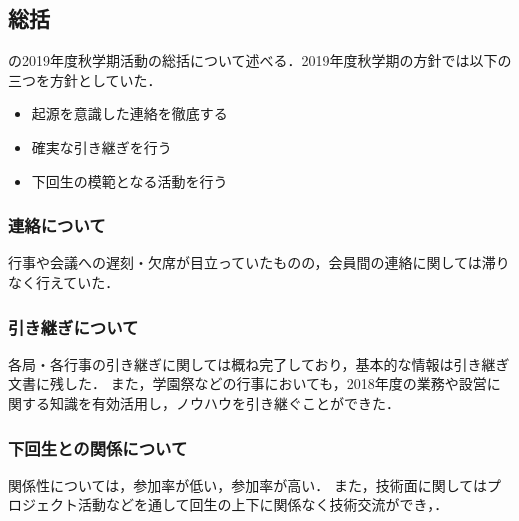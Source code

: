 \subsection*{\secondGrade{}総括}


\secondGrade{}の2019年度秋学期活動の総括について述べる．2019年度秋学期の方針では以下の三つを方針としていた．
\begin{itemize}
    \item 起源を意識した連絡を徹底する
    \item 確実な引き継ぎを行う
    \item 下回生の模範となる活動を行う

\end{itemize}

\subsubsection*{連絡について}
行事や会議への遅刻・欠席が目立っていたものの，会員間の連絡に関しては滞りなく行えていた． 
\subsubsection*{引き継ぎについて}
各局・各行事の引き継ぎに関しては概ね完了しており，基本的な情報は引き継ぎ文書に残した．
また，学園祭などの行事においても，2018年度の業務や設営に関する知識を有効活用し，ノウハウを引き継ぐことができた． 
\subsubsection*{下回生との関係について}
関係性については，参加率が低い，参加率が高い．
また，技術面に関してはプロジェクト活動などを通して回生の上下に関係なく技術交流ができ，．